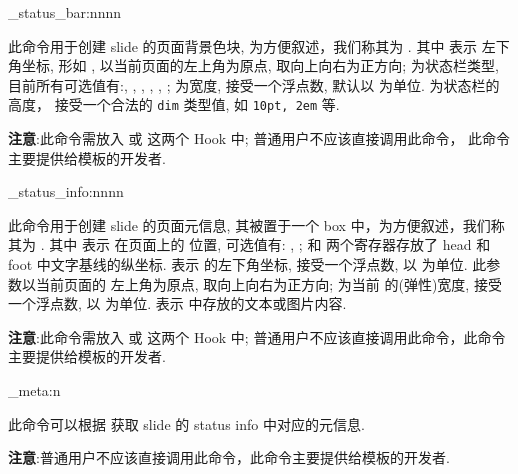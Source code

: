 \begin{function}[updated=2025-04-25]{\zslide_status_bar:nnnn}
  \begin{syntax}
     
  \end{syntax}
  此命令用于创建 slide 的页面背景色块, 为方便叙述，我们称其为 . 其中  表示  左下角坐标, 形如
  \ztexverb{(10pt, -.1\paperwidth)}, 以当前页面的左上角为原点, 取向上向右为正方向;  为状态栏类型, 目前所有可选值有:, , 
  , , , ;  为宽度, 接受一个浮点数, 默认以 \cmd{\paperwidth} 为单位.  为状态栏的高度，
  接受一个合法的 \texttt{dim} 类型值, 如 \texttt{10pt, 2em} 等.\par
  \textbf{注意}:此命令需放入  或  这两个 Hook 中; 普通用户不应该直接调用此命令，
  此命令主要提供给模板的开发者.
\end{function}


\begin{function}[updated=2025-04-25]{\zslide_status_info:nnnn}
  \begin{syntax}
     
  \end{syntax}
  此命令用于创建 slide 的页面元信息, 其被置于一个 box 中，为方便叙述，我们称其为 . 其中  表示  在页面上的
  位置, 可选值有: , ;  和  两个寄存器存放了 head 
  和 foot 中文字基线的纵坐标.  表示  的左下角坐标, 接受一个浮点数, 以 \cmd{\paperwidth} 为单位. 此参数以当前页面的
  左上角为原点, 取向上向右为正方向;  为当前  的(弹性)宽度, 接受一个浮点数, 以 \cmd{\paperwidth} 为单位.  
  表示  中存放的文本或图片内容.\par
  \textbf{注意}:此命令需放入  或  这两个 Hook 中; 普通用户不应该直接调用此命令，此命令主要提供给模板的开发者.
\end{function}



\begin{function}[updated=2025-04-25]{\zslide_meta:n}
  \begin{syntax}
     
  \end{syntax}
  此命令可以根据  获取 slide 的 status info 中对应的元信息. \par
  \textbf{注意}:普通用户不应该直接调用此命令，此命令主要提供给模板的开发者.
\end{function}


